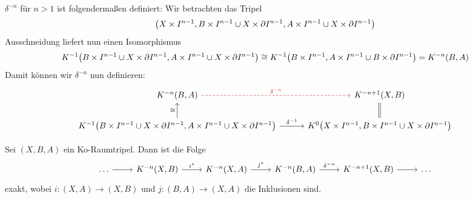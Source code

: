 $\delta^{-n}$ für $n>1$ ist folgendermaßen definiert: Wir betrachten das Tripel
\[
	\enbrace[\big]{X \times I^{n-1}, B \times I^{n-1} \cup X \times \partial I^{n-1}, A \times I^{n-1} \cup X \times \partial I^{n-1}} 
\]
Ausschneidung liefert nun einen Isomorphismus
\[
	K^{-1} \enbrace[\big]{B \times I^{n-1} \cup X \times \partial I^{n-1}, A \times I^{n-1} \cup X \times \partial I^{n-1}} 
	\cong K^{-1} \enbrace*{B \times I^{n-1}, A \times I^{n-1} \cup B \times \partial I^{n-1}} = K^{-n}(B,A) 
\]
Damit können wir $\delta^{-n}$ nun definieren:
\[
	\begin{tikzcd}[column sep=2.9em]
		K^{-n}(B,A) \rar[dashed,"\delta^{-n}",Firebrick3] & K^{-n+1}(X,B) \dar[equal]\\
		K^{-1} \enbrace*{B \times I^{n-1} \cup X \times \partial I^{n-1}, A \times I^{n-1} \cup X \times \partial I^{n-1}} \rar["\delta^{-1}"] \uar["\cong"] &
		K^0 \enbrace*{X \times I^{n-1}, B \times I^{n-1} \cup X \times \partial I^{n-1}}  
	\end{tikzcd}
\]
\begin{theorem}[{name=[Exakte Tripelsequenz]}]
Sei $(X,B,A)$ ein Ko-Raumtripel. Dann ist die Folge
\[
	\begin{tikzcd}
		\ldots \rar & K^{-n}(X,B) \rar["i^*"] & K^{-n}(X,A) \rar["j^*"] & K^{-n}(B,A) \rar["\delta^{-n}"] & K^{-n+1}(X,B) \rar & \ldots 
	\end{tikzcd}
\]
exakt, wobei $i \colon (X,A) \to (X,B)$ und $j \colon (B,A) \to (X,A)$ die Inklusionen sind.
\end{theorem}
